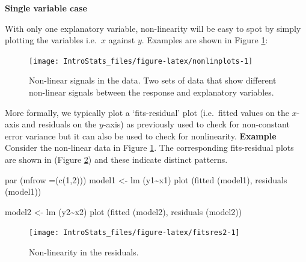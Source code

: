 \documentclass[
  oneside]{krantz}
\newenvironment{Shaded}{\begin{snugshade}}{\end{snugshade}}
\newcommand{\AttributeTok}[1]{\textcolor[rgb]{0.77,0.63,0.00}{#1}}
\newcommand{\DecValTok}[1]{\textcolor[rgb]{0.00,0.00,0.81}{#1}}
\newcommand{\FunctionTok}[1]{\textcolor[rgb]{0.00,0.00,0.00}{#1}}
\newcommand{\NormalTok}[1]{#1}
\newcommand{\OtherTok}[1]{\textcolor[rgb]{0.56,0.35,0.01}{#1}}
\newcommand{\SpecialCharTok}[1]{\textcolor[rgb]{0.00,0.00,0.00}{#1}}
\begin{document}
\textbf{Single variable case}

With only one explanatory variable, non-linearity will be easy to spot by simply plotting the variables i.e.~\(x\) against \(y\). Examples are shown in Figure \ref{fig:nonlinplots}:

\begin{figure}

{\centering \texttt{[image: IntroStats\_files/figure-latex/nonlinplots-1]} 

}

\caption{Non-linear signals in the data. Two sets of data that show different non-linear signals between the response and explanatory variables.}\label{fig:nonlinplots}
\end{figure}

More formally, we typically plot a `fits-residual' plot (i.e.~fitted values on the \(x\)-axis and residuals on the \(y\)-axis) as previously used to check for non-constant error variance but it can also be used to check for nonlinearity.
\textbf{Example} Consider the non-linear data in Figure \ref{fig:nonlinplots}. The corresponding fits-residual plots are shown in (Figure \ref{fig:fitsres2}) and these indicate distinct patterns.

\begin{Shaded}
\begin{Highlighting}[]
\FunctionTok{par}\NormalTok{ (}\AttributeTok{mfrow =}\NormalTok{(}\FunctionTok{c}\NormalTok{(}\DecValTok{1}\NormalTok{,}\DecValTok{2}\NormalTok{)))}
\NormalTok{model1 }\OtherTok{\textless{}{-}} \FunctionTok{lm}\NormalTok{ (y1}\SpecialCharTok{\textasciitilde{}}\NormalTok{x1)}
\FunctionTok{plot}\NormalTok{ (}\FunctionTok{fitted}\NormalTok{ (model1), }\FunctionTok{residuals}\NormalTok{ (model1))}

\NormalTok{model2 }\OtherTok{\textless{}{-}} \FunctionTok{lm}\NormalTok{ (y2}\SpecialCharTok{\textasciitilde{}}\NormalTok{x2)}
\FunctionTok{plot}\NormalTok{ (}\FunctionTok{fitted}\NormalTok{ (model2), }\FunctionTok{residuals}\NormalTok{ (model2))}
\end{Highlighting}
\end{Shaded}

\begin{figure}

{\centering \texttt{[image: IntroStats\_files/figure-latex/fitsres2-1]} 

}

\caption{Non-linearity in the residuals.}\label{fig:fitsres2}
\end{figure}
\end{document}
